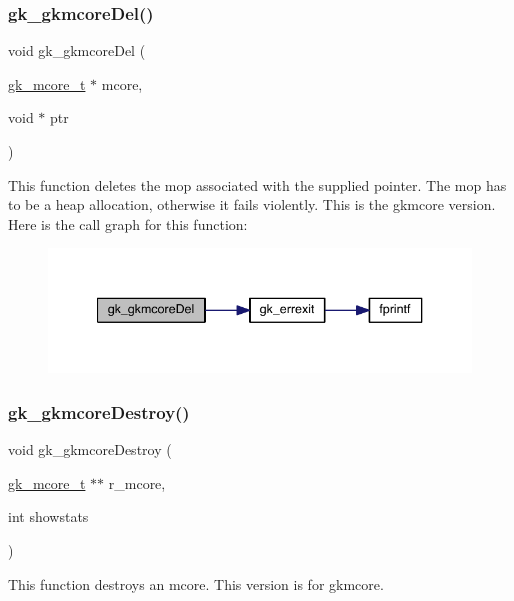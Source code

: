 \subsubsection{\texorpdfstring{gk\+\_\+gkmcore\+Del()}{gk\_gkmcoreDel()}}
{\footnotesize\ttfamily void gk\+\_\+gkmcore\+Del (\begin{DoxyParamCaption}\item[{\hyperlink{a00682}{gk\+\_\+mcore\+\_\+t} $\ast$}]{mcore,  }\item[{void $\ast$}]{ptr }\end{DoxyParamCaption})}

This function deletes the mop associated with the supplied pointer. The mop has to be a heap allocation, otherwise it fails violently. This is the gkmcore version. Here is the call graph for this function\+:\nopagebreak
\begin{figure}[H]
\begin{center}
\leavevmode
\includegraphics[width=340pt]{a00107_a6b0166aa10e35fb252f8561cac8f3bbb_cgraph}
\end{center}
\end{figure}
\mbox{\label{a00107_af01302d6237a06da732bba561ed53538}} 
\subsubsection{\texorpdfstring{gk\+\_\+gkmcore\+Destroy()}{gk\_gkmcoreDestroy()}}
{\footnotesize\ttfamily void gk\+\_\+gkmcore\+Destroy (\begin{DoxyParamCaption}\item[{\hyperlink{a00682}{gk\+\_\+mcore\+\_\+t} $\ast$$\ast$}]{r\+\_\+mcore,  }\item[{int}]{showstats }\end{DoxyParamCaption})}

This function destroys an mcore. This version is for gkmcore. \mbox{\label{a00107_ad8c9738b8a6a34af2aa8f271fe14cfa9}} 
